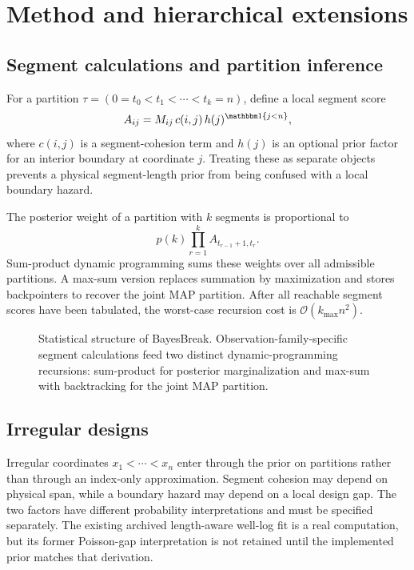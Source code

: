 \section{Method and hierarchical extensions}
\label{sec:exec-method}

\subsection{Segment calculations and partition inference}

For a partition $\tau=(0=t_0<t_1<\cdots<t_k=n)$, define a local segment score
\[
  A_{ij}=M_{ij}\,c(i,j)\,h(j)^{\mathbbm 1\{j<n\}},
\]
where $c(i,j)$ is a segment-cohesion term and $h(j)$ is an optional prior factor for an interior boundary at coordinate $j$. Treating these as separate objects prevents a physical segment-length prior from being confused with a local boundary hazard.

The posterior weight of a partition with $k$ segments is proportional to
\[
  p(k)\prod_{r=1}^{k} A_{t_{r-1}+1,t_r}.
\]
Sum-product dynamic programming sums these weights over all admissible partitions. A max-sum version replaces summation by maximization and stores backpointers to recover the joint MAP partition. After all reachable segment scores have been tabulated, the worst-case recursion cost is $\mathcal O(k_{\max}n^2)$.

\begin{figure}[H]
  \centering
  \resizebox{0.96\textwidth}{!}{}
  \caption{Statistical structure of BayesBreak. Observation-family-specific segment calculations feed two distinct dynamic-programming recursions: sum-product for posterior marginalization and max-sum with backtracking for the joint MAP partition.}
  \label{fig:exec-segment-partition}
\end{figure}

\subsection{Irregular designs}

Irregular coordinates $x_1<\cdots<x_n$ enter through the prior on partitions rather than through an index-only approximation. Segment cohesion may depend on physical span, while a boundary hazard may depend on a local design gap. The two factors have different probability interpretations and must be specified separately. The existing archived length-aware well-log fit is a real computation, but its former Poisson-gap interpretation is not retained until the implemented prior matches that derivation.

